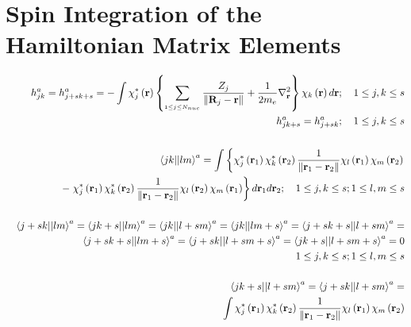 \documentclass{article}
\begin{document}
\section{Spin Integration of the Hamiltonian Matrix Elements\label{spinint}}

\begin{eqnarray}
&&h_{jk}^{a}=h_{j+sk+s}^{a}=-\int \chi _{j}^{\ast }\left( \mathbf{r}\right)
\left\{ \sum_{_{1\leq j\leq N_{nuc}}}\frac{Z_{j}}{\left\| \mathbf{R}_{j}-%
\mathbf{r}\right\| }+\frac{1}{2m_{e}}\nabla _{\mathbf{r}}^{2}\right\} \chi
_{k}\left( \mathbf{r}\right) d\mathbf{r};\quad 1\leq j,k\leq s  \notag \\
&&h_{jk+s}^{a}=h_{j+sk}^{a};\quad 1\leq j,k\leq s \\
&&  \notag \\
&&\left\langle jk||lm\right\rangle ^{a}=\int \left\{ \chi _{j}^{\ast }\left( 
\mathbf{r}_{1}\right) \chi _{k}^{\ast }\left( \mathbf{r}_{2}\right) \frac{1}{%
\left\| \mathbf{r}_{1}-\mathbf{r}_{2}\right\| }\chi _{l}\left( \mathbf{r}%
_{1}\right) \chi _{m}\left( \mathbf{r}_{2}\right) \right.  \notag \\
&&\qquad -\left. \chi _{j}^{\ast }\left( \mathbf{r}_{1}\right) \chi
_{k}^{\ast }\left( \mathbf{r}_{2}\right) \frac{1}{\left\| \mathbf{r}_{1}-%
\mathbf{r}_{2}\right\| }\chi _{l}\left( \mathbf{r}_{2}\right) \chi
_{m}\left( \mathbf{r}_{1}\right) \right\} d\mathbf{r}_{1}d\mathbf{r}%
_{2};\quad 1\leq j,k\leq s;1\leq l,m\leq s \\
&&  \notag \\
&&\left\langle j+sk||lm\right\rangle ^{a}=\left\langle jk+s||lm\right\rangle
^{a}=\left\langle jk||l+sm\right\rangle ^{a}=\left\langle
jk||lm+s\right\rangle ^{a}=\left\langle j+sk+s||l+sm\right\rangle ^{a}= 
\notag \\
&&\left\langle j+sk+s||lm+s\right\rangle ^{a}=\left\langle
j+sk||l+sm+s\right\rangle ^{a}=\left\langle jk+s||l+sm+s\right\rangle ^{a}=0
\notag \\
&&\left. {}\right. \quad \qquad \qquad \quad \qquad \qquad \quad \qquad
\qquad \quad \qquad \qquad \quad 1\leq j,k\leq s;1\leq l,m\leq s \\
&&  \notag \\
&&\left\langle jk+s||l+sm\right\rangle ^{a}=\left\langle
j+sk||l+sm\right\rangle ^{a}=  \notag \\
&&\int \chi _{j}^{\ast }\left( \mathbf{r}_{1}\right) \chi _{k}^{\ast }\left( 
\mathbf{r}_{2}\right) \frac{1}{\left\| \mathbf{r}_{1}-\mathbf{r}_{2}\right\| 
}\chi _{l}\left( \mathbf{r}_{1}\right) \chi _{m}\left( \mathbf{r}_{2}\right)

\end{eqnarray}
\end{document}
